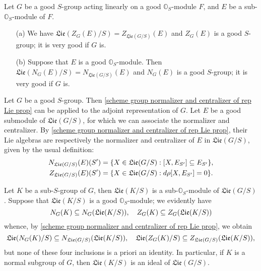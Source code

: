 \begin{theorem}\label{scheme group normalizer and centralizer of rep Lie prop}
Let $G$ be a good $S$-group acting linearly on a good $\mathbb{O}_S$-module $F$, and $E$ be a sub-$\mathbb{O}_S$-module of $F$.
\begin{enumerate}
    \item[(a)] We have $\mathfrak{Lie}(Z_G(E)/S)=Z_{\mathfrak{Lie}(G/S)}(E)$ and $Z_G(E)$ is a good $S$-group; it is very good if $G$ is.
    \item[(b)] Suppose that $E$ is a good $\mathbb{O}_S$-module. Then $\mathfrak{Lie}(N_G(E)/S)=N_{\mathfrak{Lie}(G/S)}(E)$ and $N_G(E)$ is a good $S$-group; it is very good if $G$ is.
\end{enumerate}
\end{theorem}

\begin{example}
Let $G$ be a good $S$-group. Then \cref{scheme group normalizer and centralizer of rep Lie prop} can be applied to the adjoint representation of $G$. Let $E$ be a good submodule of $\mathfrak{Lie}(G/S)$, for which we can associate the normalizer and centralizer. By \cref{scheme group normalizer and centralizer of rep Lie prop}, their Lie algebras are respectively the normalizer and centralizer of $E$ in $\mathfrak{Lie}(G/S)$, given by the usual definition:
\begin{align*}
N_{\mathfrak{Lie}(G/S)}(E)(S')&=\{X\in\mathfrak{Lie}(G/S):[X,E_{S'}]\subseteq E_{S'}\},\\
Z_{\mathfrak{Lie}(G/S)}(E)(S')&=\{X\in\mathfrak{Lie}(G/S):d\rho[X,E_{S'}]=0\}.
\end{align*}
\end{example}

\begin{example}
Let $K$ be a sub-$S$-group of $G$, then $\mathfrak{Lie}(K/S)$ is a sub-$\mathbb{O}_S$-module of $\mathfrak{Lie}(G/S)$. Suppose that $\mathfrak{Lie}(K/S)$ is a good $\mathbb{O}_S$-module; we evidently have
\[N_G(K)\subseteq N_G(\mathfrak{Lie}(K/S)),\quad Z_G(K)\subseteq Z_G(\mathfrak{Lie}(K/S))\]
whence, by \cref{scheme group normalizer and centralizer of rep Lie prop}, we obtain
\[\mathfrak{Lie}(N_G(K)/S)\subseteq N_{\mathfrak{Lie}(G/S)}(\mathfrak{Lie}(K/S)),\quad \mathfrak{Lie}(Z_G(K)/S)\subseteq Z_{\mathfrak{Lie}(G/S)}(\mathfrak{Lie}(K/S)),\]
but none of these four inclusions is a priori an identity. In particular, if $K$ is a normal subgroup of $G$, then $\mathfrak{Lie}(K/S)$ is an ideal of $\mathfrak{Lie}(G/S)$.
\end{example}

